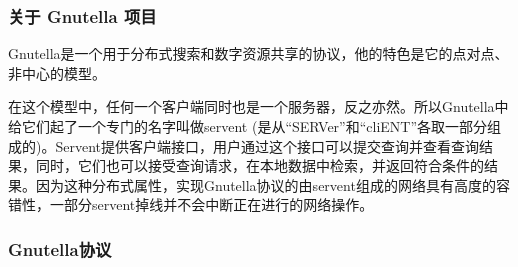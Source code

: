 \documentclass{ctexart}
\begin{document}
\subsubsection{关于 Gnutella 项目}
Gnutella是一个用于分布式搜索和数字资源共享的协议，他的特色是它的点对点、非中心的模型。

在这个模型中，任何一个客户端同时也是一个服务器，反之亦然。所以Gnutella中给它们起了一个专门的名字叫做servent (是从“SERVer”和“cliENT”各取一部分组成的)。Servent提供客户端接口，用户通过这个接口可以提交查询并查看查询结果，同时，它们也可以接受查询请求，在本地数据中检索，并返回符合条件的结果。因为这种分布式属性，实现Gnutella协议的由servent组成的网络具有高度的容错性，一部分servent掉线并不会中断正在进行的网络操作。
\subsubsection{Gnutella协议}
\end{document}

